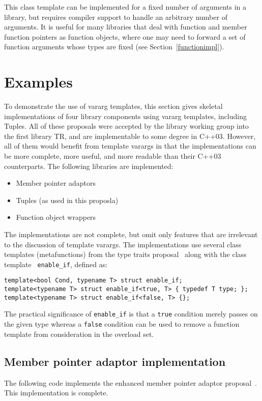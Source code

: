 \documentclass{article}
\begin{document}
This class template can be implemented for a fixed number of
arguments in a library, but requires compiler support to handle an
arbitrary number of arguments. It is useful for many libraries that
deal with function and member function pointers as function objects,
where one may need to forward a set of function arguments whose types
are fixed (see Section~\ref{functionimpl}).

\section{Examples}
To demonstrate the use of vararg templates, this section gives
skeletal implementations of four library components using vararg
templates, including Tuples. All of these proposals were accepted by
the library working group into the first library TR, and are
implementable to some degree in C++03. However, all of them would
benefit from template varargs in that the implementations can be more
complete, more useful, and more readable than their C++03
counterparts. The following libraries are implemented:

\begin{itemize}
\item Member pointer adaptors~\cite{Dimov03a}
\item Tuples (as used in this proposla)~\cite{Jarvi02}
\item Function object wrappers~\cite{Gregor02}
\end{itemize}

The implementations are not complete, but omit only features that are
irrelevant to the discussion of template varargs. The implementations
use several class templates (metafunctions) from the type traits
proposal~\cite{Maddock03} along with the class template {\tt
  enable\_if}, defined as:
\begin{verbatim}
template<bool Cond, typename T> struct enable_if;
template<typename T> struct enable_if<true, T> { typedef T type; };
template<typename T> struct enable_if<false, T> {};
\end{verbatim}

The practical significance of {\tt enable\_if} is that a {\tt true}
condition merely passes on the given type whereas a {\tt false}
condition can be used to remove a function template from consideration
in the overload set.

\subsection{Member pointer adaptor implementation}
\label{mem_fnimpl}
The following code implements the enhanced member pointer adaptor
proposal~\cite{Dimov03a}. This implementation is complete.
\end{document}
